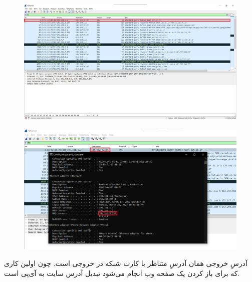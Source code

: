 \documentclass{article}
\begin{document}
\subsection{}
\begin{figure}[H]
    \centering
    \includegraphics[width=1.0\textwidth]{figures/21.jpg}
    \caption{}
    \label{fig:fig1}
\end{figure}
\begin{figure}[H]
    \centering
    \includegraphics[width=1.0\textwidth]{figures/22.jpg}
    \caption{}
    \label{fig:fig1}
\end{figure}
آدرسِ خروجی همان آدرسِ  متناظر با کارت شبکه در خروجی  است. چون اولین کاری که برای باز کردن یک صفحه وب انجام می‌شود تبدیل آدرس سایت به آی‌پی است.


\section{}
\end{document}
